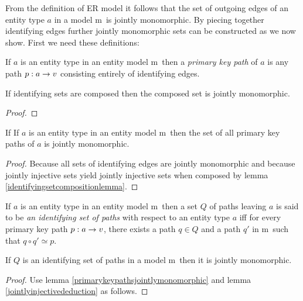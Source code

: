 \documentclass[10pt,a4paper]{article}
\newcommand{\commentary}[1]{\marginpar{\footnotesize #1}}
\newcommand{\genericmodel}{\mathcal{M}}
\renewcommand{\genericmodel}{{m}}
\newcommand{\term}[1]{\textit{{#1}}}
\begin{document}
From the definition of ER model it follows that the set of outgoing edges of an entity type 
$a$ in a model \genericmodel\ is jointly monomorphic. 
By piecing together identifying edges further jointly monomorphic sets can be constructed 
as we now show. First we need these definitions:

\begin{definition}
If $a$ is an entity type in an entity model \genericmodel\ then a \term{primary key path}
of $a$ is any path $p:a \rightarrow v$ consisting entirely of identifying edges. 
\end{definition}

\begin{lemma}
\label{identifyingsetcompositionlemma}
If identifying sets are composed then the composed set is jointly monomorphic.
\end{lemma}
\begin{proof}
\end{proof}

\begin{lemma}
\label{primarykeypathsjointlymonomorphic}
If If $a$ is an entity type in an entity model \genericmodel\ then the set of all primary key paths 
of $a$ is jointly monomorphic.
\end{lemma}
\begin{proof}
Because all sets of identifying edges are jointly monomorphic and because jointly injective sets
yield jointly injective sets when composed by lemma \ref{identifyingsetcompositionlemma}. \commentary{Do a better job of this proof.}
\end{proof}

\begin{definition}
If $a$ is an entity type in an entity model \genericmodel\ then a set $Q$ of paths 
leaving $a$ is said to be \term{an identifying set of paths} with respect 
to an entity type $a$ iff for every primary key path $p:a \rightarrow v$, there exists 
a path $q \in Q$ and a path $q'$ in \genericmodel\ such that $q \circ q' \simeq p$.
\end{definition}

\begin{lemma}
If $Q$ is an identifying set of paths in a model \genericmodel\ then it is jointly monomorphic.
\end{lemma}
\begin{proof}
Use lemma \ref{primarykeypathsjointlymonomorphic} and lemma \ref{jointlyinjectivededuction} as follows. 
\end{proof}
\end{document}
